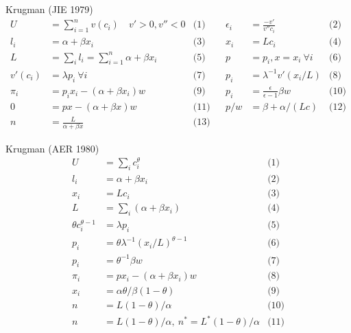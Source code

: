 \documentclass[10pt,notes=hide]{beamer}
\begin{document}
\begin{frame}{Krugman (JIE 1979)}
\begin{align*}
U &= \sum_{i=1}^{n} v(c_i) \quad v'>0, v''<0
&\text{(1)} &&
\epsilon_i &= \frac{-v'}{v'' c_i}
&\text{(2)} \\
l_i &= \alpha + \beta x_i
&\text{(3)} &&
x_i &= L c_i
&\text{(4)} \\
L &= \sum_i l_i = \sum_{i=1}^{n} \alpha + \beta x_i
&\text{(5)} &&
p &= p_i, x=x_i \ \forall i 
&\text{(6)} \\
v'(c_i) &= \lambda p_i \ \forall i 
&\text{(7)} &&
p_i &= \lambda^{-1} v'\left(x_i / L\right) 
&\text{(8)} \\
\pi_i &= p_i x_i - (\alpha+\beta x_i) w 
&\text{(9)} &&
p_i &= \frac{\epsilon}{\epsilon-1}\beta w 
&\text{(10)} \\
0 &= px - (\alpha+\beta x)w 
&\text{(11)} &&
p/w & = \beta + \alpha/(Lc) 
&\text{(12)} \\
n &= \frac{L}{\alpha + \beta x} 
&\text{(13)}
\end{align*}
\end{frame}
\begin{frame}{Krugman (AER 1980)}
\begin{align*}
U &= \sum_i c_i^{\theta} 
&\text{(1)} \\
l_i &= \alpha + \beta x_i 
&\text{(2)} \\
x_i &= L c_i 
&\text{(3)} \\
L &= \sum_i (\alpha + \beta x_i) 
&\text{(4)} \\
\theta c_i ^{\theta-1} &= \lambda p_i 
&\text{(5)} \\
p_i &=  \theta \lambda^{-1} (x_i / L)^{\theta-1} 
&\text{(6)} \\
p_i &= \theta^{-1} \beta w 
&\text{(7)} \\
\pi_i &= px_i - (\alpha+\beta x_i)w 
&\text{(8)} \\
x_i &= \alpha \theta / \beta (1-\theta) 
&\text{(9)} \\
n &= L(1-\theta)/\alpha 
&\text{(10)} \\
n &= L(1-\theta)/\alpha, \  n^* = L^*(1-\theta)/\alpha 
&\text{(11)}
\end{align*}
\end{frame}
\end{document}
